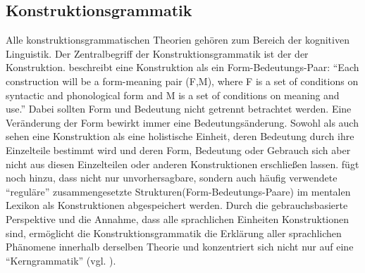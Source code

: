 


\subsection{Konstruktionsgrammatik}
Alle konstruktionsgrammatischen Theorien gehören zum Bereich der kognitiven Linguistik.
Der Zentralbegriff der Konstruktionsgrammatik ist der der Konstruktion.
\cite{Lakoff87} beschreibt eine Konstruktion als ein Form-Bedeutungs-Paar:
``Each construction will be a form-meaning pair (F,M), where F is a set of conditions on syntactic and phonological form and M is a set of conditions on meaning and use.''
Dabei sollten Form und Bedeutung nicht getrennt betrachtet werden.
Eine Veränderung der Form bewirkt immer eine Bedeutungsänderung.
Sowohl \cite{Lakoff87} als auch \cite{Goldberg95} sehen eine Konstruktion als eine holistische Einheit, deren Bedeutung durch ihre Einzelteile bestimmt wird und deren Form, Bedeutung oder Gebrauch sich aber nicht aus diesen Einzelteilen oder anderen Konstruktionen erschließen lassen.
\cite{Goldberg06} fügt noch hinzu, dass nicht nur unvorhersagbare, sondern auch häufig verwendete ``reguläre'' zusammengesetzte Strukturen(Form-Bedeutungs-Paare) im mentalen Lexikon als Konstruktionen abgespeichert werden.
Durch die gebrauchsbasierte Perspektive und die Annahme, dass alle sprachlichen Einheiten Konstruktionen sind, ermöglicht die Konstruktionsgrammatik die Erklärung aller sprachlichen Phänomene innerhalb derselben Theorie und konzentriert sich nicht nur auf eine ``Kerngrammatik'' (vgl. \cite{Tomasello06}).


